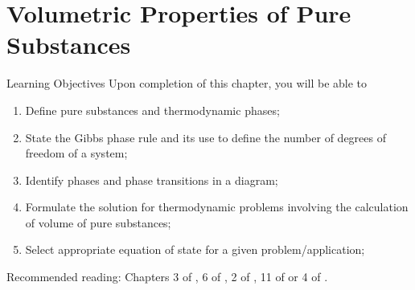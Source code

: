 \chapter{Volumetric Properties of Pure Substances}\label{Chapter:VolumetricPropertiesPureSubstances}

   \begin{LearningObjectivesBlock}{Learning Objectives}
      Upon completion of this chapter, you will be able to
        \begin{enumerate}
           \item Define pure substances and thermodynamic phases;
           \item State the Gibbs phase rule and its use to define the number of degrees of freedom of a system;
           \item Identify phases and phase transitions in a diagram;
           \item Formulate the solution for thermodynamic problems involving the calculation of volume of pure substances;
           \item Select appropriate equation of state for a given problem/application;
        \end{enumerate}
\medskip
     Recommended reading: Chapters 3 of \citet{SmithVanNess_Book}, 6 of \citet{Sandler_Book}, 2 of \citet{Borgnakke_Book}, 11 of \citet{Moran_Book} or 4 of \citet{Atkins_Book}.
   \end{LearningObjectivesBlock}

  

